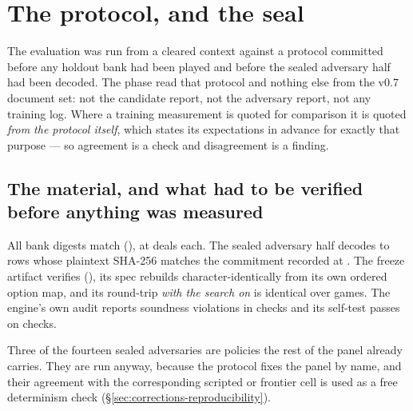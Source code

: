 \section{The protocol, and the seal}
\label{sec:protocol}

The evaluation was run from a cleared context against a protocol committed before any holdout bank had
been played and before the sealed adversary half had been decoded. The phase read that protocol and
nothing else from the v0.7 document set: not the candidate report, not the adversary report, not any
training log. Where a training measurement is quoted for comparison it is quoted \emph{from the
protocol itself}, which states its expectations in advance for exactly that purpose --- so agreement
is a check and disagreement is a finding.

\subsection{The material, and what had to be verified before anything was measured}
\label{sec:protocol-material}

\begin{table}[t]\centering
\caption{The deal banks, each digest recomputed before any cell was played by folding the six dealt
hands and the dealer of every deal into a rolling hash without constructing a policy or playing a
game. The committed digests were computed by a \emph{different build} of the engine at seal time, so
agreement is between two binaries as well as two dates.}
\label{tab:banks}

\end{table}

All \vsevenBanks{} bank digests match (\vsevenBanksMatch{}), at \vsevenBankDeals{} deals each. The
sealed adversary half decodes to \vsevenSealedRows{} rows whose plaintext SHA-256 matches the
commitment recorded at \texttt{\vsevenSealCommit{}}. The freeze artifact verifies
(\vsevenFreezeVerify{}), its spec rebuilds character-identically from its own ordered option map, and
its round-trip \emph{with the search on} is identical over \vsevenRtwoaGames{} games. The engine's own
audit reports \vsevenVerifyViolations{} soundness violations in \vsevenVerifyChecks{} checks and its
self-test passes on \vsevenSelftestChecks{} checks.

Three of the fourteen sealed adversaries are policies the rest of the panel already carries. They are
run anyway, because the protocol fixes the panel by name, and their agreement with the corresponding
scripted or frontier cell is used as a free determinism check
(\S\ref{sec:corrections-reproducibility}).

